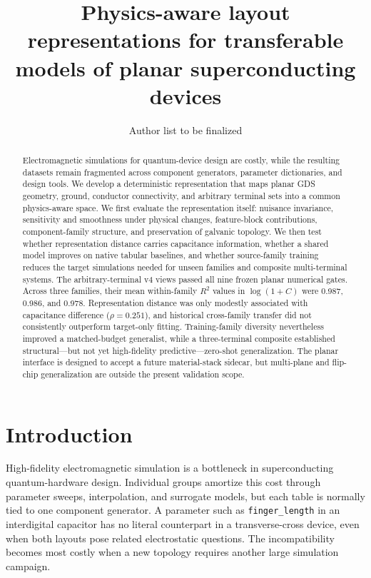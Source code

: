 \documentclass[11pt]{article}
\title{Physics-aware layout representations for transferable models of planar superconducting devices}
\author{Author list to be finalized}
\date{}
\begin{document}
\maketitle

\begin{abstract}
Electromagnetic simulations for quantum-device design are costly, while the
resulting datasets remain fragmented across component generators, parameter
dictionaries, and design tools. We develop a deterministic representation that
maps planar GDS geometry, ground, conductor connectivity, and arbitrary terminal
sets into a common physics-aware space. We first evaluate the representation
itself: nuisance invariance, sensitivity and smoothness under physical changes,
feature-block contributions, component-family structure, and preservation of
galvanic topology. We then test whether representation distance carries
capacitance information, whether a shared model improves on native tabular
baselines, and whether source-family training reduces the target simulations
needed for unseen families and composite multi-terminal systems.
The arbitrary-terminal v4 views passed all nine frozen planar numerical gates.
Across three families, their mean within-family $R^2$ values in
$\log(1+C)$ were 0.987, 0.986, and 0.978. Representation distance was only
modestly associated with capacitance difference ($\rho=0.251$), and historical
cross-family transfer did not consistently outperform target-only fitting.
Training-family diversity nevertheless improved a matched-budget generalist,
while a three-terminal composite established structural---but not yet
high-fidelity predictive---zero-shot generalization.
The planar interface is designed to accept a future material-stack sidecar, but
multi-plane and flip-chip generalization are outside the present validation
scope.
\end{abstract}

\section*{Introduction}
High-fidelity electromagnetic simulation is a bottleneck in superconducting
quantum-hardware design. Individual groups amortize this cost through parameter
sweeps, interpolation, and surrogate models, but each table is normally tied to
one component generator. A parameter such as \texttt{finger\_length} in an
interdigital capacitor has no literal counterpart in a transverse-cross device,
even when both layouts pose related electrostatic questions. The incompatibility
becomes most costly when a new topology requires another large simulation
campaign.
\end{document}

